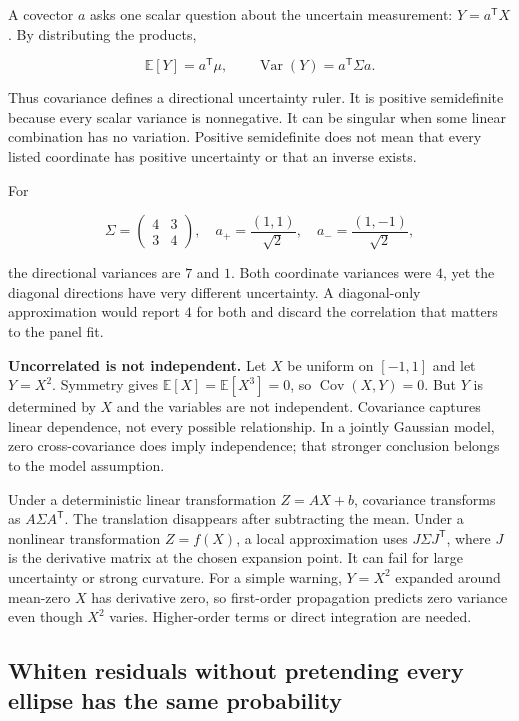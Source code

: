 A covector \(a\) asks one scalar question about the uncertain measurement: \(Y=a^{\mathsf T}X\). By distributing the products,

\[
\mathbb E[Y]=a^{\mathsf T}\mu,\qquad
\operatorname{Var}(Y)=a^{\mathsf T}\Sigma a.
\]

Thus covariance defines a directional uncertainty ruler. It is positive semidefinite because every scalar variance is nonnegative. It can be singular when some linear combination has no variation. Positive semidefinite does not mean that every listed coordinate has positive uncertainty or that an inverse exists.

For

\[
\Sigma=\begin{pmatrix}4&3\\3&4\end{pmatrix},
\quad a_+=\frac{(1,1)}{\sqrt2},\quad
a_-=\frac{(1,-1)}{\sqrt2},
\]

the directional variances are \(7\) and \(1\). Both coordinate variances were \(4\), yet the diagonal directions have very different uncertainty. A diagonal-only approximation would report \(4\) for both and discard the correlation that matters to the panel fit.

\textbf{Uncorrelated is not independent.} Let \(X\) be uniform on \([-1,1]\) and let \(Y=X^2\). Symmetry gives \(\mathbb E[X]=\mathbb E[X^3]=0\), so \(\operatorname{Cov}(X,Y)=0\). But \(Y\) is determined by \(X\) and the variables are not independent. Covariance captures linear dependence, not every possible relationship. In a jointly Gaussian model, zero cross-covariance does imply independence; that stronger conclusion belongs to the model assumption.

Under a deterministic linear transformation \(Z=AX+b\), covariance transforms as \(A\Sigma A^{\mathsf T}\). The translation disappears after subtracting the mean. Under a nonlinear transformation \(Z=f(X)\), a local approximation uses \(J\Sigma J^{\mathsf T}\), where \(J\) is the derivative matrix at the chosen expansion point. It can fail for large uncertainty or strong curvature. For a simple warning, \(Y=X^2\) expanded around mean-zero \(X\) has derivative zero, so first-order propagation predicts zero variance even though \(X^2\) varies. Higher-order terms or direct integration are needed.

\subsection{Whiten residuals without pretending every ellipse has the same probability}\label{02-foundations-ii-ch023-whiten-residuals-without-pretending-every-ellipse-has-the-same-probability}

